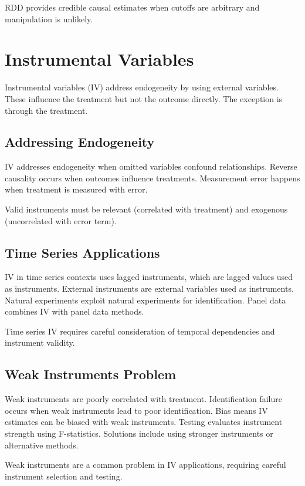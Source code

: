 RDD provides credible causal estimates when cutoffs are arbitrary and manipulation is unlikely.

\section{Instrumental Variables}

Instrumental variables (IV) address endogeneity by using external variables. These influence the treatment but not the outcome directly. The exception is through the treatment.

\subsection{Addressing Endogeneity}

IV addresses endogeneity when omitted variables confound relationships. Reverse causality occurs when outcomes influence treatments. Measurement error happens when treatment is measured with error.

Valid instruments must be relevant (correlated with treatment) and exogenous (uncorrelated with error term).

\subsection{Time Series Applications}

IV in time series contexts uses lagged instruments, which are lagged values used as instruments. External instruments are external variables used as instruments. Natural experiments exploit natural experiments for identification. Panel data combines IV with panel data methods.

Time series IV requires careful consideration of temporal dependencies and instrument validity.

\subsection{Weak Instruments Problem}

Weak instruments are poorly correlated with treatment. Identification failure occurs when weak instruments lead to poor identification. Bias means IV estimates can be biased with weak instruments. Testing evaluates instrument strength using F-statistics. Solutions include using stronger instruments or alternative methods.

Weak instruments are a common problem in IV applications, requiring careful instrument selection and testing.

